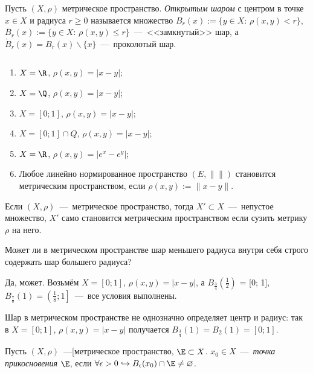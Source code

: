 \begin{definition}
    Пусть $(X, \rho)$ метрическое пространство. \textit{Открытым шаром} с центром в точке $x \in X$ и радиуса $r \geq 0$ называется множество $B_r (x) := \{ y \in X$: $\rho(x, y) < r\}$, $\overline{B}_r (x) := \{ y \in X$: $\rho(x, y) \leq r\}$~---~<<замкнутый>> шар, а $\mathring{B}_{r} (x) = B_{r} (x) \backslash \{x\}$~---~проколотый шар.
\end{definition}
\begin{examples}$\ $
    \begin{enumerate}
        \item $X = \R$, $\rho(x, y) = |x - y|$;
        \item $X = \Q$, $\rho(x, y) = |x - y|$;
        \item $X = [0; 1]$, $\rho(x, y) = |x - y|$;
        \item $X = [0; 1] \cap Q$, $\rho(x, y) = |x - y|$;
        \item $X = \R$, $\rho(x, y) = |e^x - e^y|$;
        \item Любое линейно нормированное пространство $(E, \| \|)$ становится метрическим пространством, если $\rho(x, y) := \| x - y\|$.
    \end{enumerate}
\end{examples}
\begin{note}
    Если $(X, \rho)$~---~метрическое пространство, тогда $X' \subset X$~---~непустое множество, $X'$ само становится метрическим пространством если сузить метрику $\rho$ на него.
\end{note}
\begin{problem}
    Может ли в метрическом пространстве шар меньшего радиуса внутри себя строго содержать шар большего радиуса?
\end{problem}
\begin{solution}
    Да, может. Возьмём $X = [0; 1]$, $\rho(x, y) = |x - y|$, а $B_{\frac{3}{4}} \left(\frac{1}{2}\right)$ = [0; 1], $B_{\frac{7}{8}} (1) = \left(\frac{1}{8}; 1\right]$~---~все условия выполнены.
\end{solution}
\begin{note}
    Шар в метрическом пространстве не однозначно определяет центр и радиус: так в $X = [0; 1]$, $\rho(x, y) = |x - y|$ получается $B_{\frac{3}{4}} \left( 1\right) = B_{2} (1) = [0; 1]$.
\end{note}
\begin{definition}
    \hypertarget{def7.6}{Пусть $(X, \rho)$~---[метрическое пространство, $\E \subset X$. $x_{0} \in X$~---~\textit{точка прикосновения} $\E$, если $\forall \epsilon > 0 \hookrightarrow B_{\epsilon} (x_{0}) \cap \E \neq \varnothing$.}
\end{definition}
